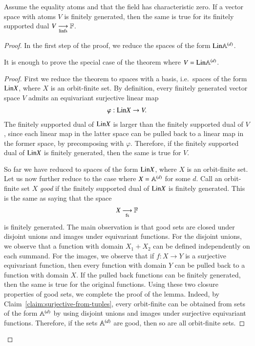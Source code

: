 \begin{theorem}
\label{thm:duals-finite-generation}
Assume the equality atoms and that the field has characteristic zero. If a vector space with atoms $V$  is finitely generated, then the same is true for its finitely supported dual $V \underset{\text{linfs}}{\longrightarrow} \mathbb F$.
\end{theorem}
\begin{proof}
    In the first step of the proof, we reduce the spaces of the form $\mathrm{Lin} \mathbb A^{(d)}$. 
    \begin{lemma}\label{lem:reduce-to-atoms-d-duals}
        It is enough to prove  the special case of the theorem where $V=\mathrm{Lin} \mathbb A^{(d)}$.
    \end{lemma}
    \begin{proof}
        First we reduce the theorem to spaces with a basis, i.e.~spaces of the form $\mathrm{Lin} X$, where $X$ is an orbit-finite set. By definition, every finitely generated vector space $V$ admits an equivariant surjective linear map 
        \begin{align*}
        \varphi : \mathrm{Lin} X \to V.
        \end{align*}
        The finitely supported dual of $\mathrm{Lin} X$ is larger than the finitely supported dual of $V$, since each linear map in the latter space can be pulled back to a linear map in the former space, by precomposing with $\varphi$. Therefore, if the finitely supported dual of $\mathrm{Lin} X$ is  finitely generated, then the same is true for $V$.

        So far we have reduced to spaces of the form $\mathrm{Lin} X$, where $X$ is an orbit-finite set. Let us now further reduce to the case where $X = \mathbb A^{(d)}$ for some $d$. 
        Call an orbit-finite set $X$ \emph{good} if the finitely supported dual of $\mathrm{Lin} X$ is finitely generated. This is the same as saying that the space 
        \begin{align*}
        X \underset{\text{fs}}{\longrightarrow} \mathbb F
        \end{align*}
        is finitely generated. The main observation is that good sets are closed under disjoint unions and images under equivariant functions. For the disjoint unions, we observe that  a function with domain $X_1 + X_2$ can be defined independently on each summand. For the images, we observe that if $f : X \to Y$ is a surjective equivariant function, then every function with  domain $Y$ can be pulled back to a function with domain $X$. If the pulled back functions can be finitely generated, then the same is true for the original functions. Using these two closure properties of good sets, we complete the proof of the lemma. Indeed, by   Claim~\ref{claim:surjective-from-tuples}, every orbit-finite can be obtained from sets of the form $\mathbb A^{(d)}$ by using disjoint unions and images under surjective equivariant functions. Therefore, if the sets $\mathbb A^{(d)}$ are good, then so are all orbit-finite sets.
    \end{proof}


\end{proof}

